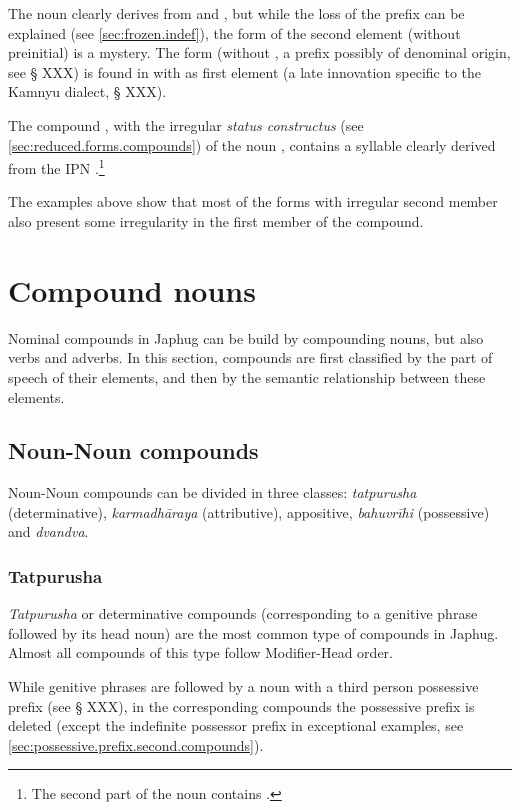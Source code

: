The noun  clearly derives from  and , but while the loss of the  prefix can be explained (see \ref{sec:frozen.indef}), the form of the second element (without  preinitial) is a mystery. The form  (without , a prefix possibly of denominal origin, see § XXX) is found in  with  as first element (a late innovation specific to the Kamnyu dialect, § XXX).
 
 The compound , with the irregular \textit{status constructus}  (see \ref{sec:reduced.forms.compounds}) of the noun , contains a syllable   clearly derived from the IPN .\footnote{The second part of the noun  contains . }  
 
The examples above show that most of the forms with irregular second member also present some irregularity in the first member of the compound. 

\section{Compound nouns}
Nominal compounds in Japhug can be build by compounding nouns, but also verbs and adverbs. In this section, compounds are first classified by the part of speech of their elements, and then by the semantic relationship between these elements.

\subsection{Noun-Noun compounds} \label{sec.n.n.compounds}
Noun-Noun compounds can be divided in three classes: \textit{tatpurusha} (determinative),   \textit{karmadhāraya} (attributive), appositive, \textit{bahuvrīhi} (possessive)  and \textit{dvandva}.

\subsubsection{Tatpurusha} \label{sec:tatpurusha.n.n}
\textit{Tatpurusha} or determinative compounds (corresponding to a genitive phrase followed by its head noun) are the most common type of compounds in Japhug. Almost all compounds of this type follow Modifier-Head order.

While genitive phrases are followed by a noun with a third person possessive prefix (see § XXX), in the corresponding compounds the possessive prefix is deleted (except the indefinite possessor prefix in exceptional examples, see \ref{sec:possessive.prefix.second.compounds}).

